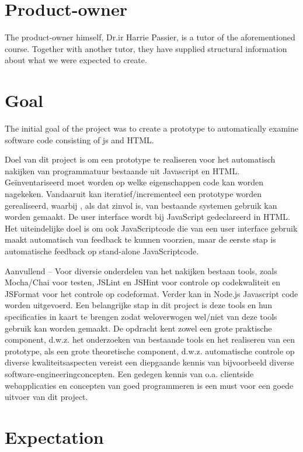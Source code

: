 \section{Product-owner}

The product-owner himself, Dr.ir Harrie Passier, is a tutor of the aforementioned course.
Together with another tutor, they have supplied structural information about
what we were expected to create.


\section{Goal}
The initial goal of the project was to create a prototype to automatically examine
software code consisting of \gls{js} and HTML.

Doel van dit project is om een prototype te realiseren voor het automatisch nakijken van programmatuur bestaande uit Javascript en HTML. Geïnventariseerd moet worden op welke eigenschappen code kan worden nagekeken. Vandaaruit kan iteratief/incrementeel een prototype worden gerealiseerd, waarbij , als dat zinvol is, van bestaande systemen gebruik kan worden gemaakt.
De user interface wordt bij JavaScript gedeclareerd in HTML. Het uiteindelijke doel is om ook JavaScriptcode die van een user interface gebruik maakt automatisch van feedback te kunnen voorzien, maar de eerste stap is automatische feedback op stand-alone JavaScriptcode.

Aanvullend – Voor diversie onderdelen van het nakijken bestaan tools, zoals Mocha/Chai voor testen, JSLint en JSHint voor controle op codekwaliteit en JSFormat voor het controle op codeformat. Verder kan in Node.js Javascript code worden uitgevoerd. Een belangrijke stap in dit project is deze tools en hun specificaties in kaart te brengen zodat weloverwogen wel/niet van deze tools gebruik kan worden gemaakt.
De opdracht kent zowel een grote praktische component, d.w.z. het onderzoeken van bestaande tools en het realiseren van een prototype, als een grote theoretische component, d.w.z. automatische controle op diverse kwaliteitsaspecten vereist een diepgaande kennis van bijvoorbeeld diverse software-engineeringconcepten.
Een gedegen kennis van o.a. clientside webapplicaties en concepten van goed programmeren is een must voor een goede uitvoer van dit project.

\section{Expectation}

